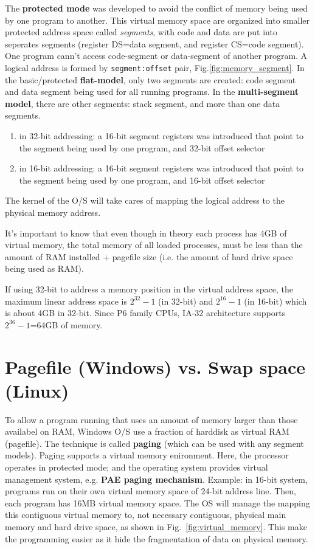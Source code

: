 The {\bf protected mode} was developed to avoid the conflict of memory being
used by one program to another. This virtual memory space are organized into
smaller protected address space called {\it segments}, with code and data are
put into seperates segments (register DS=data segment, and register CS=code
segment). One program cann't access code-segment or data-segment of another
program. A logical address is formed by \verb!segment:offset! pair,
Fig.\ref{fig:memory_segment}. In the basic/protected {\bf flat-model}, only two
segments are created: code segment and data segment being used for all running
programs. In the {\bf multi-segment model}, there are other segments: stack
segment, and more than one data segments.

\begin{enumerate}
  \item in 32-bit addressing: a 16-bit segment registers was introduced that point to the
segment being used by one program, and 32-bit offset selector
\item in 16-bit addressing: a 16-bit segment registers was introduced that point to the
segment being used by one program, and 16-bit offset selector
\end{enumerate} 
The kernel of the O/S will take cares of mapping the logical address to the
physical memory address. 

It's important to know that even though in theory each process has 4GB of
virtual memory, the total memory of all loaded processes, must be less than the
amount of RAM installed + pagefile size (i.e. the amount of hard drive space
being used as RAM). 


\begin{mdframed}
If using 32-bit to address a memory position in the virtual address space, the
maximum linear address space is $2^{32}-1$ (in 32-bit) and $2^{16}-1$ (in
16-bit) which is about 4GB in 32-bit. Since P6 family CPUs, IA-32 architecture
supports $2^{36}-1$=64GB of memory.  
\end{mdframed} 

\section{Pagefile (Windows) vs. Swap space (Linux)}
\label{sec:pagefile}

To allow a program running that uses an amount of memory larger than those
availabel on RAM, Windows O/S  use a fraction of harddisk as
virtual RAM (pagefile). The technique is called {\bf paging} (which can be used with
any segment models).
Paging supports a virtual memory enironment. Here, the processor operates in protected mode; and the
operating system provides virtual management system, e.g. {\bf PAE paging
mechanism}. Example: in 16-bit system, programs run on their own
virtual memory space of 24-bit address line. Then, each program has 16MB virtual
memory space. The OS will manage the mapping this contiguous virtual memory to,
not necessary contiguous, physical main memory and hard drive space, as shown in
Fig.~\ref{fig:virtual_memory}. This make the programming easier as it hide the
fragmentation of data on physical memory.  


